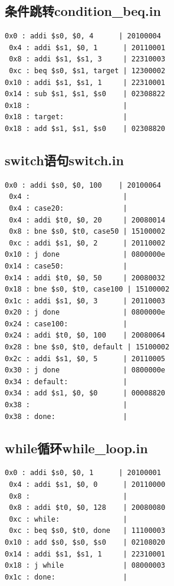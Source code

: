 \documentclass[twocolumn]{article} %
\begin{document}
\begin{sloppypar}
\subsection{条件跳转condition\_beq.in}

\begin{lstlisting}[]  
 0x0 : addi $s0, $0, 4      | 20100004
 0x4 : addi $s1, $0, 1      | 20110001
 0x8 : addi $s1, $s1, 3     | 22310003
 0xc : beq $s0, $s1, target | 12300002
0x10 : addi $s1, $s1, 1     | 22310001
0x14 : sub $s1, $s1, $s0    | 02308822
0x18 :                      | 
0x18 : target:              | 
0x18 : add $s1, $s1, $s0    | 02308820
\end{lstlisting}  

\subsection{switch语句switch.in}

\begin{lstlisting}[]  
 0x0 : addi $s0, $0, 100    | 20100064
 0x4 :                      | 
 0x4 : case20:              | 
 0x4 : addi $t0, $0, 20     | 20080014
 0x8 : bne $s0, $t0, case50 | 15100002
 0xc : addi $s1, $0, 2      | 20110002
0x10 : j done               | 0800000e
0x14 : case50:              | 
0x14 : addi $t0, $0, 50     | 20080032
0x18 : bne $s0, $t0, case100 | 15100002
0x1c : addi $s1, $0, 3      | 20110003
0x20 : j done               | 0800000e
0x24 : case100:             | 
0x24 : addi $t0, $0, 100    | 20080064
0x28 : bne $s0, $t0, default | 15100002
0x2c : addi $s1, $0, 5      | 20110005
0x30 : j done               | 0800000e
0x34 : default:             | 
0x34 : add $s1, $0, $0      | 00008820
0x38 :                      | 
0x38 : done:                | 
\end{lstlisting}  

\subsection{while循环while\_loop.in}

\begin{lstlisting}[]  
 0x0 : addi $s0, $0, 1      | 20100001
 0x4 : addi $s1, $0, 0      | 20110000
 0x8 :                      | 
 0x8 : addi $t0, $0, 128    | 20080080
 0xc : while:               | 
 0xc : beq $s0, $t0, done   | 11100003
0x10 : add $s0, $s0, $s0    | 02108020
0x14 : addi $s1, $s1, 1     | 22310001
0x18 : j while              | 08000003
0x1c : done:                | 
\end{lstlisting}  


\end{sloppypar}
\end{document}
